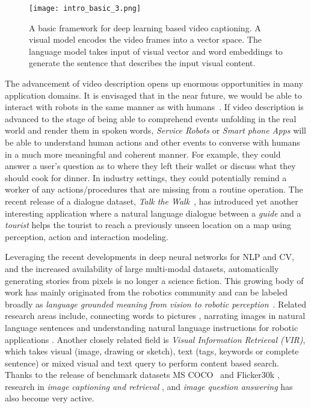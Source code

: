 \documentclass[10pt,journal,compsoc]{IEEEtran}
\begin{document}
\begin{figure*}[htbp] %
     \centering
     \texttt{[image: intro\_basic\_3.png]}
    \vspace{-3mm}
     \caption{A basic framework for deep learning based video captioning. A visual model encodes the video frames into a vector space. The language model takes input of visual vector and word embeddings to generate the sentence that describes the input visual content.}
\label{fig:basicblockdiagram}
\vspace{-5mm}
\end{figure*}

The advancement of video description opens up enormous opportunities in many application domains. It is envisaged that in the near future, we would be able to interact with robots in the same manner as with humans~\cite{rohrbach2013translating}. If video description is advanced to the stage of being able to comprehend events unfolding in the real world and render them in spoken words, \textit{Service Robots} or \textit{Smart phone Apps} will be able to understand human actions and other events to converse with humans in a much more meaningful and coherent manner. For example, they could answer a user's question as to where they left their wallet or discuss what they should cook for dinner. In industry settings, they could potentially remind a worker of any actions/procedures that are missing from a routine operation. The recent release of a dialogue dataset, \emph{Talk the Walk}~\cite{talkthewalk}, has introduced yet another interesting application where a natural language dialogue between a \emph{guide} and a \emph{tourist} helps the tourist to reach a previously unseen location on a map using perception, action and interaction modeling.

Leveraging the recent developments in deep neural networks for NLP and CV, and the increased availability of large multi-modal datasets, automatically generating stories from pixels is no longer a science fiction. This growing body of work has mainly originated from the robotics community and can be labeled broadly as \textit{language grounded meaning from vision to robotic perception}~\cite{Roy2005b}. Related research areas include, connecting words to pictures \cite{barnard2003matching,berg2004names,deng2009construction}, narrating images in natural language sentences \cite{farhadi2010every,kulkarni2011baby,li2011composing} and understanding natural language instructions for robotic applications \cite{guadarrama2013grounding,matuszek2010following,tellex2011understanding}. 
Another closely related field is \emph{Visual Information Retrieval (VIR)}, which takes visual (image, drawing or sketch), text (tags, keywords or complete sentence) or mixed visual and text query to perform content based search. Thanks to the release of benchmark datasets MS COCO~\cite{lin2014microsoft} and Flicker30k \cite{young2014image}, research in \textit{image captioning and retrieval} \cite{donahue2015long,kiros2014unifying,fang2015captions,mao2015learning}, and \textit{image question answering}  \cite{malinowski2014multi,antol2015vqa,ren2015exploring,yu2015visual} has also become very active.
\end{document}
